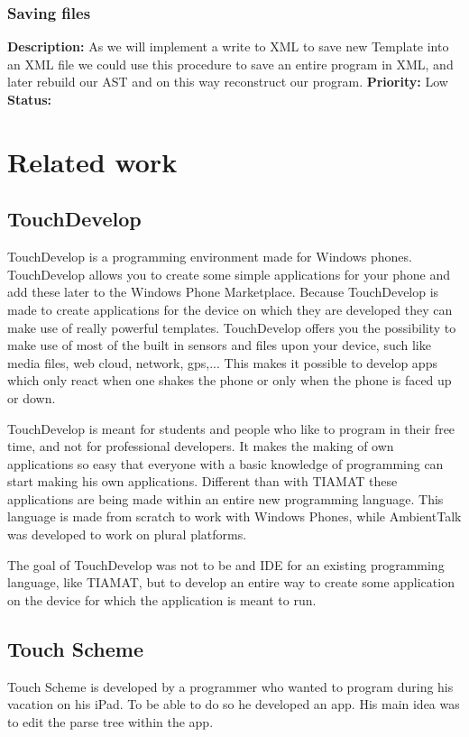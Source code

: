 \documentclass[a4paper,12pt]{report}
\begin{document}
\subsection{Saving files}
\textbf{Description: } As we will implement a write to XML to save new Template into an XML file we could use this procedure to save an entire program in XML, and later rebuild our AST and on this way 
reconstruct our program. \newline
\textbf{Priority:} Low \newline
\textbf{Status: }
\chapter{Related work}
\section{TouchDevelop}
TouchDevelop is a programming environment made for Windows phones. TouchDevelop allows you to create some simple applications for your phone and add these later to the Windows Phone Marketplace. 
Because TouchDevelop is made to create applications for the device on which they are developed they can make use of really powerful templates. TouchDevelop offers you the possibility to make use 
of most of the built in sensors and files upon your device, such like media files, web cloud, network, gps,... This makes it possible to develop apps which only react when one shakes the phone or
only when the phone is faced up or down.

TouchDevelop is meant for students and people who like to program in their free time, and not for professional developers. It makes the making of own applications so easy that everyone with a 
basic knowledge of programming can start making his own applications. Different than with TIAMAT these applications are being made within an entire new programming language. This language
is made from scratch to work with Windows Phones, while AmbientTalk was developed to work on plural platforms.

The goal of TouchDevelop was not to be and IDE for an existing programming language, like TIAMAT, but to develop an entire way to create some application on the device for which the application
is meant to run.  
\section{Touch Scheme}
Touch Scheme is developed by a programmer who wanted to program during his vacation on his iPad. To be able to do so he developed an app. His main idea was to edit the parse tree within the app.
\end{document}
